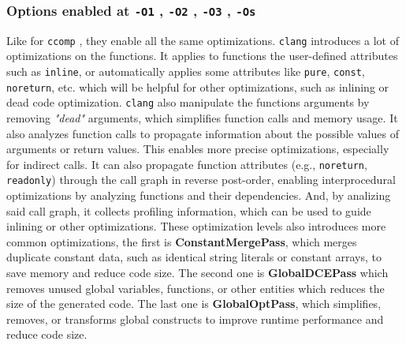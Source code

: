 \documentclass{rapport}
\newcommand{\clang}{\texttt{clang} }
\newcommand{\comp}{\texttt{ccomp} }
\newcommand{\optione}{\texttt{-O1} }
\newcommand{\optitwo}{\texttt{-O2} }
\newcommand{\optithree}{\texttt{-O3} }
\newcommand{\optisize}{\texttt{-Os} }
\begin{document}
\subsubsection{Options enabled at \optione, \optitwo, \optithree, \optisize}
Like for \comp, they enable all the same optimizations. 
\newline\newline
\clang introduces a lot of optimizations on the functions. \newline
It applies to functions the user-defined attributes such as \texttt{inline}, or automatically applies some attributes like \texttt{pure}, \texttt{const}, \texttt{noreturn}, etc. which will be helpful for other optimizations, such as inlining or dead code optimization. \newline
\clang also manipulate the functions arguments by removing \textit{"dead"} arguments, which simplifies function calls and memory usage. It also analyzes function calls to propagate information about the possible values of arguments or return values. This enables more precise optimizations, especially for indirect calls. \newline
It can also propagate function attributes (e.g., \texttt{noreturn}, \texttt{readonly}) through the call graph in reverse post-order, enabling interprocedural optimizations by analyzing functions and their dependencies. And, by analizing said call graph, it collects profiling information, which can be used to guide inlining or other optimizations.
\newline\newline
These optimization levels also introduces more common optimizations, the first is \textbf{ConstantMergePass}, which merges duplicate constant data, such as identical string literals or constant arrays, to save memory and reduce code size. The second one is \textbf{GlobalDCEPass} which removes unused global variables, functions, or other entities which reduces the size of the generated code. The last one is \textbf{GlobalOptPass}, which simplifies, removes, or transforms global constructs to improve runtime performance and reduce code size.



\clearpage
\nocite{*}


\end{document}
